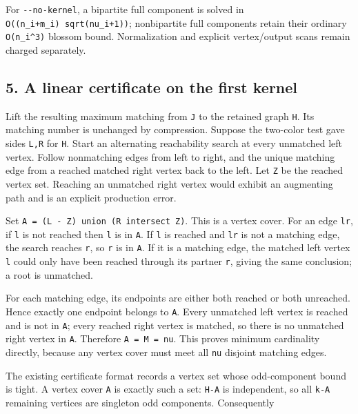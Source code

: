 For \texttt{-\/-no-kernel}, a bipartite full component is solved in \texttt{O((n\_i+m\_i)\ sqrt(nu\_i+1))}; nonbipartite full components retain their ordinary \texttt{O(n\_i\^{}3)} blossom bound. Normalization and explicit vertex/output scans remain charged separately.

\hypertarget{af-4c656876fd-a-linear-certificate-on-the-first-kernel}{%
\subsection{5. A linear certificate on the first kernel}\label{af-4c656876fd-a-linear-certificate-on-the-first-kernel}}

Lift the resulting maximum matching from \texttt{J} to the retained graph \texttt{H}. Its matching number is unchanged by compression. Suppose the two-color test gave sides \texttt{L,R} for \texttt{H}. Start an alternating reachability search at every unmatched left vertex. Follow nonmatching edges from left to right, and the unique matching edge from a reached matched right vertex back to the left. Let \texttt{Z} be the reached vertex set. Reaching an unmatched right vertex would exhibit an augmenting path and is an explicit production error.

Set \texttt{A\ =\ (L\ -\ Z)\ union\ (R\ intersect\ Z)}. This is a vertex cover. For an edge \texttt{lr}, if \texttt{l} is not reached then \texttt{l} is in \texttt{A}. If \texttt{l} is reached and \texttt{lr} is not a matching edge, the search reaches \texttt{r}, so \texttt{r} is in \texttt{A}. If it is a matching edge, the matched left vertex \texttt{l} could only have been reached through its partner \texttt{r}, giving the same conclusion; a root is unmatched.

For each matching edge, its endpoints are either both reached or both unreached. Hence exactly one endpoint belongs to \texttt{A}. Every unmatched left vertex is reached and is not in \texttt{A}; every reached right vertex is matched, so there is no unmatched right vertex in \texttt{A}. Therefore \texttt{\textbar{}A\textbar{}\ =\ \textbar{}M\textbar{}\ =\ nu}. This proves minimum cardinality directly, because any vertex cover must meet all \texttt{nu} disjoint matching edges.

The existing certificate format records a vertex set whose odd-component bound is tight. A vertex cover \texttt{A} is exactly such a set: \texttt{H-A} is independent, so all \texttt{k-\textbar{}A\textbar{}} remaining vertices are singleton odd components. Consequently

